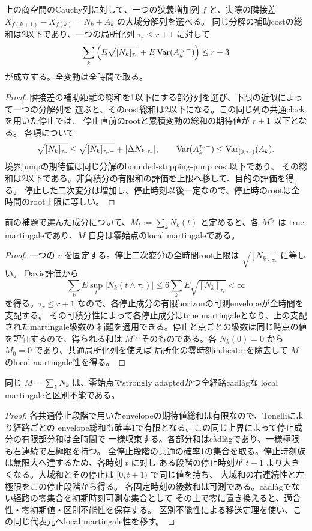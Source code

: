 \begin{lemma}[大域分解を保持した共通成分評価]
上の商空間のCauchy列に対して、一つの狭義増加列 $f$ と、実際の隣接差
$X_{f(k+1)}-X_{f(k)}=N_k+A_k$ の大域分解列を選べる。
同じ分解の補助costの総和は2以下であり、一つの局所化列 $\tau_r\le r+1$ に対して
\[
 \sum_k\left(E\sqrt{[N_k]_{\tau_r}}+
 E\operatorname{Var}(A_k^{\tau_r-})\right)\le r+3
\]
が成立する。全変動は全時間で取る。
\end{lemma}
\begin{proof}
隣接差の補助距離の総和を1以下にする部分列を選び、下限の近似によって一つの分解列を
選ぶと、そのcost総和は2以下になる。この同じ列の共通clockを用いた停止では、
停止直前のrootと累積変動の総和の期待値が $r+1$ 以下となる。
各項について
\[
 \sqrt{[N_k]_{\tau_r}}\le
 \sqrt{[N_k]_{\tau_r-}}+|\Delta N_{k,\tau_r}|,
 \qquad
 \operatorname{Var}(A_k^{\tau_r-})\le\operatorname{Var}_{[0,\tau_r)}(A_k).
\]
境界jumpの期待値は同じ分解のbounded-stopping-jump cost以下であり、
その総和は2以下である。非負積分の有限和の評価を上限へ移して、目的の評価を得る。
停止した二次変分は増加し、停止時刻以後一定なので、停止時のrootは全時間のroot上限に等しい。
\end{proof}
\begin{lemma}[同じ大域マルチンゲール成分の和]
前の補題で選んだ成分について、$M_t:=\sum_kN_k(t)$ と定めると、各 $M^{\tau_r}$ は
true martingaleであり、$M$ 自身は零始点のlocal martingaleである。
\end{lemma}
\begin{proof}
一つの $r$ を固定する。停止二次変分の全時間root上限は $\sqrt{[N_k]_{\tau_r}}$ に等しい。
Davis評価から
\[
 \sum_k E\sup_t|N_k(t\wedge\tau_r)|
 \le 6\sum_k E\sqrt{[N_k]_{\tau_r}}<\infty
\]
を得る。$\tau_r\le r+1$ なので、各停止成分の有限horizonの可測envelopeが全時間を支配する。
その可積分性によって各停止成分はtrue martingaleとなり、上の支配されたmartingale級数の
補題を適用できる。停止と点ごとの級数は同じ時点の値を評価するので、得られる和は
$M^{\tau_r}$ そのものである。各 $N_k(0)=0$ から $M_0=0$ であり、共通局所化列を使えば
局所化の零時刻indicatorを除去して $M$ のlocal martingale性を得る。
\end{proof}
\begin{lemma}[マルチンゲール級数の正則な代表元]
同じ $M=\sum_kN_k$ は、零始点でstrongly adaptedかつ全経路càdlàgな
local martingaleと区別不能である。
\end{lemma}
\begin{proof}
各共通停止段階で用いたenvelopeの期待値総和は有限なので、Tonelliにより経路ごとの
envelope総和も確率1で有限となる。この同じ上界によって停止成分の有限部分和は全時間で
一様収束する。各部分和はcàdlàgであり、一様極限も右連続で左極限を持つ。
全停止段階の共通の確率1の集合を取る。停止時刻族は無限大へ達するため、各時刻 $t$ に対し
ある段階の停止時刻が $t+1$ より大きくなる。大域和とその停止は $[0,t+1)$ で同じ値を持ち、
大域和の右連続性と左極限をこの停止段階から得る。
各固定時刻の級数和は可測である。càdlàgでない経路の零集合を初期時刻可測な集合として
その上で零に置き換えると、適合性・零初期値・区別不能性を保存する。
区別不能性による移送定理を使い、この同じ代表元へlocal martingale性を移す。
\end{proof}

